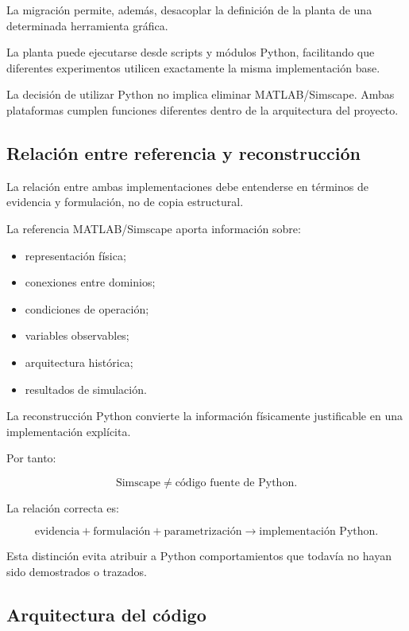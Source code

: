 La migración permite, además, desacoplar la definición de la planta de una determinada herramienta gráfica.

La planta puede ejecutarse desde scripts y módulos Python, facilitando que diferentes experimentos utilicen exactamente la misma implementación base.

La decisión de utilizar Python no implica eliminar MATLAB/Simscape. Ambas plataformas cumplen funciones diferentes dentro de la arquitectura del proyecto.

\subsection{Relación entre referencia y reconstrucción}

La relación entre ambas implementaciones debe entenderse en términos de evidencia y formulación, no de copia estructural.

La referencia MATLAB/Simscape aporta información sobre:

\begin{itemize}
    \item representación física;
    \item conexiones entre dominios;
    \item condiciones de operación;
    \item variables observables;
    \item arquitectura histórica;
    \item resultados de simulación.
\end{itemize}

La reconstrucción Python convierte la información físicamente justificable en una implementación explícita.

Por tanto:

\begin{equation}
\text{Simscape}
\neq
\text{código fuente de Python}.
\end{equation}

La relación correcta es:

\begin{equation}
\text{evidencia}
+
\text{formulación}
+
\text{parametrización}
\rightarrow
\text{implementación Python}.
\end{equation}

Esta distinción evita atribuir a Python comportamientos que todavía no hayan sido demostrados o trazados.

\subsection{Arquitectura del código}

